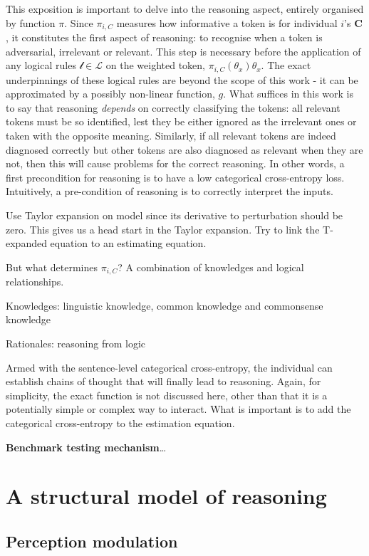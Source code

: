 \documentclass[
]{article}
\begin{document}
This exposition is important to delve into the reasoning aspect,
entirely organised by function \(\pi\). Since \(\pi_{i, C}\) measures
how informative a token is for individual \(i\)'s \(\mathbf{C}\), it
constitutes the first aspect of reasoning: to recognise when a token is
adversarial, irrelevant or relevant. This step is necessary before the
application of any logical rules \(\mathcal{l} \in \mathcal{L}\) on the
weighted token, \(\pi_{i, C}(\theta_x) \theta_x\). The exact
underpinnings of these logical rules are beyond the scope of this work -
it can be approximated by a possibly non-linear function, \(g\). What
suffices in this work is to say that reasoning \emph{depends} on
correctly classifying the tokens: all relevant tokens must be so
identified, lest they be either ignored as the irrelevant ones or taken
with the opposite meaning. Similarly, if all relevant tokens are indeed
diagnosed correctly but other tokens are also diagnosed as relevant when
they are not, then this will cause problems for the correct reasoning.
In other words, a first precondition for reasoning is to have a low
categorical cross-entropy loss. Intuitively, a pre-condition of
reasoning is to correctly interpret the inputs.

Use Taylor expansion on model since its derivative to perturbation
should be zero. This gives us a head start in the Taylor expansion. Try
to link the T-expanded equation to an estimating equation.

But what determines \(\pi_{i, C}\)? A combination of knowledges and
logical relationships.

Knowledges: linguistic knowledge, common knowledge and commonsense
knowledge

Rationales: reasoning from logic

Armed with the sentence-level categorical cross-entropy, the individual
can establish chains of thought that will finally lead to reasoning.
Again, for simplicity, the exact function is not discussed here, other
than that it is a potentially simple or complex way to interact. What is
important is to add the categorical cross-entropy to the estimation
equation.

\textbf{Benchmark testing mechanism}\ldots{}

\section{A structural model of
reasoning}\label{a-structural-model-of-reasoning}

\subsection{Perception modulation}\label{perception-modulation}
\end{document}
